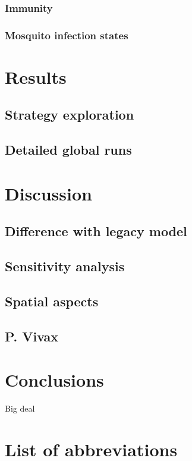 \documentclass{bmcart}
\begin{document}
\subsubsection*{Immunity}

\subsubsection*{Mosquito infection states}

\section*{Results}

\subsection*{Strategy exploration}

\subsection*{Detailed global runs}

\section*{Discussion}

\subsection*{Difference with legacy model}

\subsection*{Sensitivity analysis}

\subsection*{Spatial aspects}

\subsection*{P. Vivax}

\section*{Conclusions}

Big deal

\section*{List of abbreviations}
\end{document}
